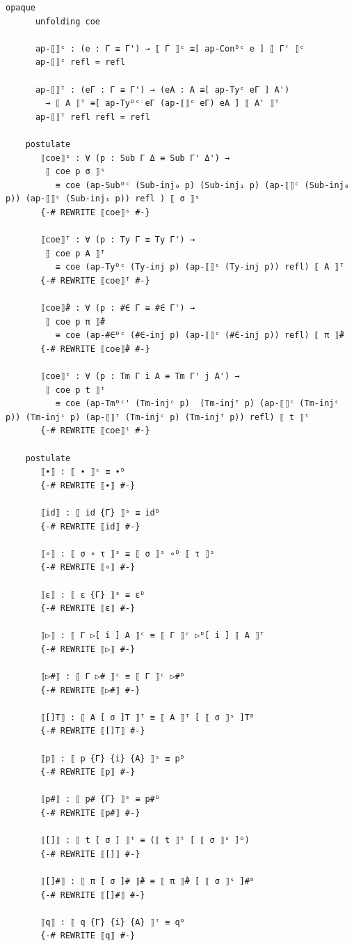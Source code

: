 {\begin{Verbatim}[breaklines=true,breakanywhere=true,fontsize=\scriptsize]
    opaque
      unfolding coe

      ap-⟦⟧ᶜ : (e : Γ ≡ Γ') → ⟦ Γ ⟧ᶜ ≡[ ap-Conᴰᶜ e ] ⟦ Γ' ⟧ᶜ
      ap-⟦⟧ᶜ refl = refl

      ap-⟦⟧ᵀ : (eΓ : Γ ≡ Γ') → (eA : A ≡[ ap-Tyᶜ eΓ ] A')
        → ⟦ A ⟧ᵀ ≡[ ap-Tyᴰᶜ eΓ (ap-⟦⟧ᶜ eΓ) eA ] ⟦ A' ⟧ᵀ
      ap-⟦⟧ᵀ refl refl = refl

    postulate
       ⟦coe⟧ˢ : ∀ (p : Sub Γ Δ ≡ Sub Γ' Δ') →
        ⟦ coe p σ ⟧ˢ
          ≡ coe (ap-Subᴰᶜ (Sub-inj₀ p) (Sub-inj₁ p) (ap-⟦⟧ᶜ (Sub-inj₀ p)) (ap-⟦⟧ᶜ (Sub-inj₁ p)) refl ) ⟦ σ ⟧ˢ
       {-# REWRITE ⟦coe⟧ˢ #-}

       ⟦coe⟧ᵀ : ∀ (p : Ty Γ ≡ Ty Γ') →
        ⟦ coe p A ⟧ᵀ
          ≡ coe (ap-Tyᴰᶜ (Ty-inj p) (ap-⟦⟧ᶜ (Ty-inj p)) refl) ⟦ A ⟧ᵀ
       {-# REWRITE ⟦coe⟧ᵀ #-}

       ⟦coe⟧̂# : ∀ (p : #∈ Γ ≡ #∈ Γ') →
        ⟦ coe p π ⟧̂#
          ≡ coe (ap-#∈ᴰᶜ (#∈-inj p) (ap-⟦⟧ᶜ (#∈-inj p)) refl) ⟦ π ⟧̂#
       {-# REWRITE ⟦coe⟧̂# #-}

       ⟦coe⟧ᵗ : ∀ (p : Tm Γ i A ≡ Tm Γ' j A') →
        ⟦ coe p t ⟧ᵗ
          ≡ coe (ap-Tmᴰᶜ' (Tm-injᶜ p)  (Tm-injᵀ p) (ap-⟦⟧ᶜ (Tm-injᶜ p)) (Tm-injⁱ p) (ap-⟦⟧ᵀ (Tm-injᶜ p) (Tm-injᵀ p)) refl) ⟦ t ⟧ᵗ
       {-# REWRITE ⟦coe⟧ᵗ #-}

    postulate
       ⟦∙⟧ : ⟦ ∙ ⟧ᶜ ≡ ∙ᴰ
       {-# REWRITE ⟦∙⟧ #-}

       ⟦id⟧ : ⟦ id {Γ} ⟧ˢ ≡ idᴰ
       {-# REWRITE ⟦id⟧ #-}

       ⟦∘⟧ : ⟦ σ ∘ τ ⟧ˢ ≡ ⟦ σ ⟧ˢ ∘ᴰ ⟦ τ ⟧ˢ
       {-# REWRITE ⟦∘⟧ #-}

       ⟦ε⟧ : ⟦ ε {Γ} ⟧ˢ ≡ εᴰ
       {-# REWRITE ⟦ε⟧ #-}

       ⟦▷⟧ : ⟦ Γ ▷[ i ] A ⟧ᶜ ≡ ⟦ Γ ⟧ᶜ ▷ᴰ[ i ] ⟦ A ⟧ᵀ
       {-# REWRITE ⟦▷⟧ #-}

       ⟦▷#⟧ : ⟦ Γ ▷# ⟧ᶜ ≡ ⟦ Γ ⟧ᶜ ▷#ᴰ
       {-# REWRITE ⟦▷#⟧ #-}

       ⟦[]T⟧ : ⟦ A [ σ ]T ⟧ᵀ ≡ ⟦ A ⟧ᵀ [ ⟦ σ ⟧ˢ ]Tᴰ
       {-# REWRITE ⟦[]T⟧ #-}

       ⟦p⟧ : ⟦ p {Γ} {i} {A} ⟧ˢ ≡ pᴰ
       {-# REWRITE ⟦p⟧ #-}

       ⟦p#⟧ : ⟦ p# {Γ} ⟧ˢ ≡ p#ᴰ
       {-# REWRITE ⟦p#⟧ #-}
       
       ⟦[]⟧ : ⟦ t [ σ ] ⟧ᵗ ≡ (⟦ t ⟧ᵗ [ ⟦ σ ⟧ˢ ]ᴰ)
       {-# REWRITE ⟦[]⟧ #-}

       ⟦[]#⟧ : ⟦ π [ σ ]# ⟧̂# ≡ ⟦ π ⟧̂# [ ⟦ σ ⟧ˢ ]#ᴰ
       {-# REWRITE ⟦[]#⟧ #-}

       ⟦q⟧ : ⟦ q {Γ} {i} {A} ⟧ᵗ ≡ qᴰ
       {-# REWRITE ⟦q⟧ #-}


\end{Verbatim}}
